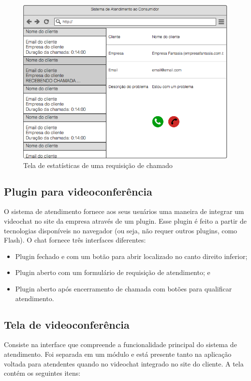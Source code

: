 \begin{figure}[ht!]
	\centering
    \includegraphics[scale=0.4]{figures/call-statistics.png} 
	\caption{Tela de estatísticas de uma requisição de chamado}
	\label{fig:call_statistics}
\end{figure}

\subsection{Plugin para videoconferência}

O sistema de atendimento fornece aos seus usuários uma maneira de integrar um videochat no site da empresa através de um plugin. Esse plugin é feito a partir de tecnologias disponíveis no navegador (ou seja, não requer outros plugins, como Flash). O chat fornece três interfaces diferentes:

\begin{itemize}
  \item Plugin fechado e com um botão para abrir localizado no canto direito inferior;
  \item Plugin aberto com um formulário de requisição de atendimento; e
  \item Plugin aberto após encerramento de chamada com botões para qualificar atendimento.
\end{itemize}

\subsection{Tela de videoconferência}

Consiste na interface que compreende a funcionalidade principal do sistema de atendimento. Foi separada em um módulo e está presente tanto na aplicação voltada para atendentes quando no videochat integrado no site do cliente. A tela contém os seguintes itens:

